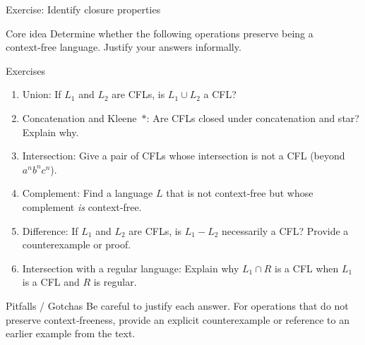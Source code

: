 \begin{frame}[t]{Exercise: Identify closure properties}
  \begin{tblock}{Core idea}
    Determine whether the following operations preserve being a
    context‑free language.  Justify your answers informally.
  \end{tblock}
  \begin{tblock}{Exercises}
    \begin{enumerate}
      \item Union: If $L_1$ and $L_2$ are CFLs, is $L_1 \cup L_2$ a CFL?
      \item Concatenation and Kleene $\ast$: Are CFLs closed under
        concatenation and star?  Explain why.
      \item Intersection: Give a pair of CFLs whose intersection is not
        a CFL (beyond $a^n b^n c^n$).
      \item Complement: Find a language $L$ that is not context‑free but
        whose complement \emph{is} context‑free.
      \item Difference: If $L_1$ and $L_2$ are CFLs, is $L_1 - L_2$
        necessarily a CFL?  Provide a counterexample or proof.
      \item Intersection with a regular language: Explain why
        $L_1 \cap R$ is a CFL when $L_1$ is a CFL and $R$ is regular.
    \end{enumerate}
  \end{tblock}
  \begin{talert}{Pitfalls / Gotchas}
    Be careful to justify each answer.  For operations that do not
    preserve context‑freeness, provide an explicit counterexample or
    reference to an earlier example from the text.
  \end{talert}
  \label{fr:6.2-20}
\end{frame}

